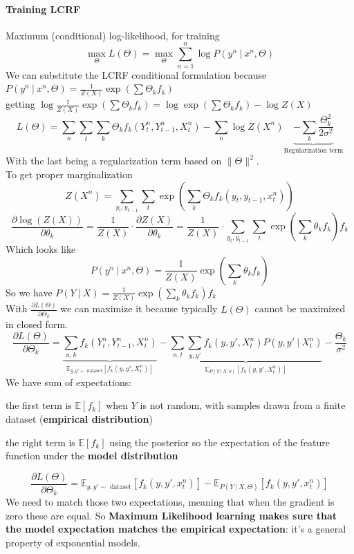 \documentclass[10pt]{report}
\begin{document}
\paragraph{Training LCRF}Maximum (conditional) log-likelihood, for training $$\max_\Theta L(\Theta) = \max_\Theta\sum_{n=1}^n\log P(y^n\:|\:x^n,\Theta)$$
We can substitute the LCRF conditional formulation because $P(y^n\:|\:x^n,\Theta) = \frac{1}{Z(X)}\exp(\sum \Theta_k f_k)$\\
getting $\log \frac{1}{Z(X)}\exp(\sum \Theta_k f_k) = \log \exp(\sum \Theta_k f_k)-\log Z(X)$
$$L(\Theta)=\sum_n\sum_t\sum_k \Theta_kf_k(Y_t^n,Y_{t-1}^n,X_t^n)-\sum_n\log Z(X^n)\underset{\text{Regularization term}}{\underbrace{-\sum_k\frac{\Theta_k^2}{2\sigma^2}}}$$
With the last being a regularization term based on $\|\Theta\|^2$.\\
To get proper marginalization $$Z(X^n) = \sum_{y_t,y_{t-1}}\sum_t \exp\left(\sum_k\Theta_k f_k(y_t,y_{t-1},x^n_t)\right)$$
$$\frac{\partial\log(Z(X))}{\partial \theta_k} = \frac{1}{Z(X)}\cdot\frac{\partial Z(X)}{\partial \theta_k} = \frac{1}{Z(X)}\cdot\sum_{y_t,y_{t-1}}\sum_t\exp\left(\sum_k\theta_k f_k\right)f_k$$
Which looks like
$$P(y^n\:|\:x^n,\Theta) = \frac{1}{Z(X)}\exp\left(\sum_k\theta_kf_k\right)$$
So we have $P(Y\:|\:X) = \frac{1}{Z(X)}\exp\left(\sum_k\theta_k f_k\right)f_k$\\
With $\frac{\partial L(\Theta)}{\partial \Theta_k}$ we can maximize it because typically $L(\Theta)$ cannot be maximized in closed form.
$$\frac{\partial L(\Theta)}{\partial \Theta_k} = \underset{\mathbb{E}_{y,y'\sim\text{ dataset}}[f_k(y,y',X_t^n)]}{\underbrace{\sum_{n,k}f_k(Y_t^n,Y_{t-1}^n,X_t^n)}}-\underset{\mathbb{E}_{P(Y\:|\:X,\theta)}[f_k(y,y',X_t^n)]}{\underbrace{\sum_{n,t}\sum_{y,y'}f_k(y,y',X_t^n)P(y,y'\:|\:X^n_t)}}-\frac{\Theta_k}{\sigma^2}$$ 
We have sum of expectations:
\begin{list}{}{}
	\item the first term is $\mathbb{E}[f_k]$ when $Y$ is not random, with samples drawn from a finite dataset (\textbf{empirical distribution})
	\item the right term is $\mathbb{E}[f_k]$ using the posterior so the expectation of the feature function under the \textbf{model distribution}
\end{list}
$$\frac{\partial L(\Theta)}{\partial \Theta_k} = \mathbb{E}_{y,y'\sim\text{ dataset}}[f_k(y,y',x^n_t)] - \mathbb{E}_{P(Y\:|\:X,\Theta)}[f_k(y,y',x_t^n)]$$
We need to match those two expectations, meaning that when the gradient is zero these are equal. So \textbf{Maximum Likelihood learning makes sure that the model expectation matches the empirical expectation}: it's a general property of exponential models.\\
\end{document}
